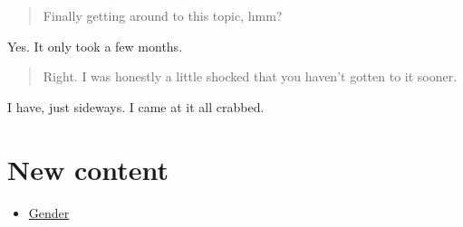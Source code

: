 \begin{quote}
Finally getting around to this topic, hmm?
\end{quote}

Yes. It only took a few months.

\begin{quote}
Right. I was honestly a little shocked that you haven't gotten to it sooner.
\end{quote}

I have, just sideways. I came at it all crabbed.

\hypertarget{new-content}{%
\section{New content}\label{new-content}}

\begin{itemize}
\tightlist
\item
  \href{/gender}{Gender}
\end{itemize}
